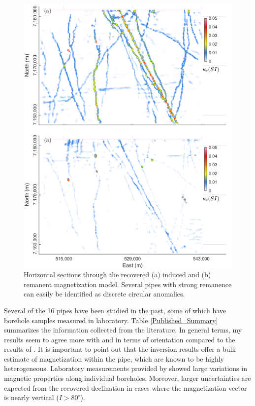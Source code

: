 \begin{figure}[p]
\includegraphics[scale=0.8]{Ekati_reg_IND_REM.png}
\caption{Horizontal sections through the recovered (a) induced and (b) remanent magnetization model. Several pipes with strong remanence can easily be identified as discrete circular anomalies.}
\label{fig:Ekati_reg_IND_REM}
\end{figure}

Several of the 16 pipes have been studied in the past, some of which have borehole samples measured in laboratory.
Table \ref{Published_Summary} summarizes the information collected from the literature.
In general terms, my results seem to agree more with \cite{Enkin2003} and \cite{Cheman2006} in terms of orientation compared to the results of \cite{Zhao2012}.
It is important to point out that the inversion results offer a bulk estimate of magnetization within the pipe, which are known to be highly heterogeneous. Laboratory measurements provided by \cite{Enkin2003} showed large variations in magnetic properties along individual boreholes.
Moreover, larger uncertainties are expected from the recovered declination in cases where the magnetization vector is nearly vertical ($I > 80^{\circ}$).


